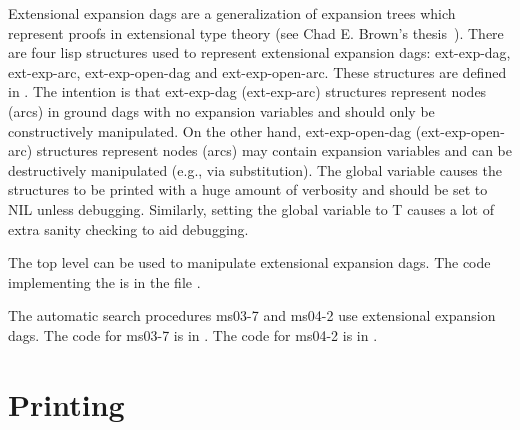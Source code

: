 Extensional expansion dags are a generalization of expansion trees which
represent proofs in extensional type theory (see Chad E. Brown's thesis~\cite{Brown2004a}).
There are four lisp structures used to represent extensional expansion dags:
ext-exp-dag, ext-exp-arc, ext-exp-open-dag and ext-exp-open-arc.
These structures are defined in .
The intention is that ext-exp-dag (ext-exp-arc) structures represent nodes (arcs) in ground dags with no
expansion variables and should only be constructively manipulated.
On the other hand, ext-exp-open-dag (ext-exp-open-arc) structures represent nodes (arcs) may contain expansion variables
and can be destructively manipulated (e.g., via substitution).
The global variable  causes the structures to be printed with
a huge amount of verbosity and should be set to NIL unless debugging.
Similarly, setting the global variable  to T causes
a lot of extra sanity checking to aid debugging.

The  top level can be used to manipulate extensional expansion dags.
The code implementing the  is in the file .

The automatic search procedures ms03-7 and ms04-2 use extensional expansion dags.
The code for ms03-7 is in .
The code for ms04-2 is in .

\section{Printing}
